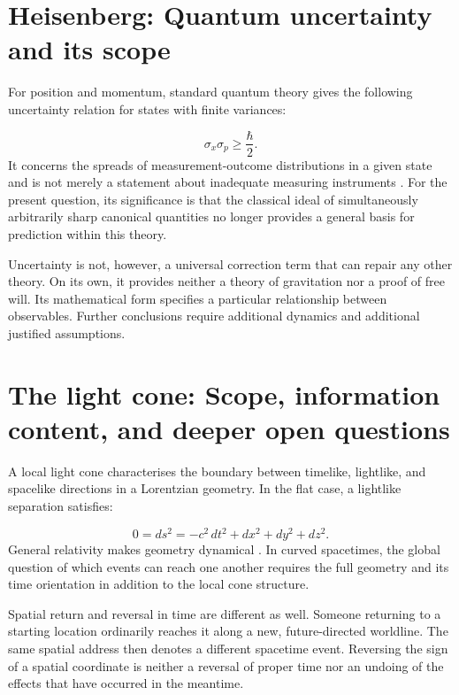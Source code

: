 \section{Heisenberg: Quantum uncertainty and its scope}\label{en:sec6}
For position and momentum, standard quantum theory gives the following uncertainty relation for states with finite variances:

\begin{equation}\label{en:eq6}
\sigma_x\sigma_p\geq\frac{\hbar}{2}.
\end{equation}
It concerns the spreads of measurement-outcome distributions in a given state and is not merely a statement about inadequate measuring instruments \cite{2,3}. For the present question, its significance is that the classical ideal of simultaneously arbitrarily sharp canonical quantities no longer provides a general basis for prediction within this theory.

Uncertainty is not, however, a universal correction term that can repair any other theory. On its own, it provides neither a theory of gravitation nor a proof of free will. Its mathematical form specifies a particular relationship between observables. Further conclusions require additional dynamics and additional justified assumptions.

\section{The light cone: Scope, information content, and deeper open questions}\label{en:sec7}
A local light cone characterises the boundary between timelike, lightlike, and spacelike directions in a Lorentzian geometry. In the flat case, a lightlike separation satisfies:

\begin{equation}\label{en:eq7}
0=ds^2=-c^2\,dt^2+dx^2+dy^2+dz^2.
\end{equation}
General relativity makes geometry dynamical \cite{1}. In curved spacetimes, the global question of which events can reach one another requires the full geometry and its time orientation in addition to the local cone structure.

Spatial return and reversal in time are different as well. Someone returning to a starting location ordinarily reaches it along a new, future-directed worldline. The same spatial address then denotes a different spacetime event. Reversing the sign of a spatial coordinate is neither a reversal of proper time nor an undoing of the effects that have occurred in the meantime.

